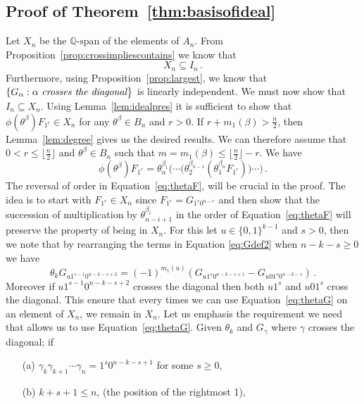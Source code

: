 \documentclass[11pt]{amsart}
\theoremstyle{definition}
\numberwithin{equation}{section}
\begin{document}
\subsection{Proof of Theorem~\ref{thm:basisofideal}}\label{ss:proofmainthm}
Let $X_n$ be the ${\mathbb Q}\text{-span}$ of the elements of $A_n$.
From Proposition~\ref{prop:crossimpliescontains} we know that
$$X_n \subseteq I_n\,.$$
Furthermore, using Proposition~\ref{prop:largest}, we know that
$\{ G_\alpha : \alpha \text{ \it crosses the diagonal}\big\}$ is linearly independent.
We must now show that $I_n\subseteq X_n$. Using Lemma~\ref{lem:idealpres} it is sufficient to show that $\phi(\theta^\beta) F_{1^r}\in X_n$ for any $ \theta^\beta \in B_n$ and
$r>0$. If $r+m_1(\beta)>\frac{n}{2}$, then Lemma~\ref{lem:degree} gives us the desired results. We can therefore assume that $0<r\le \lfloor\frac{n}{2}\rfloor$  and $\theta^\beta \in B_n$ such that $m=m_1(\beta)\le \lfloor\frac{n}{2}\rfloor-r$. We have
\begin{equation}\label{eq:thetaF}
	\phi(\theta^\beta) F_{1^r} =  \theta_n^{\beta_1} \Big(\!\!\cdots\!  \big(\theta_2^{\beta_{n-1}} (\theta_1^{\beta_n}F_{1^r})\big)\!\cdots\!\Big)\,.
\end{equation}
The reversal of order in Equation~\eqref{eq:thetaF}, will be crucial in the proof.
The idea is to start with $F_{1^r}\in X_n$ since $F_{1^r}=G_{1^r0^{n-r}}$ and then show that the succession of multiplication by $\theta_{n-i+1}^{\beta_{i}}$ in the
order of Equation~\ref{eq:thetaF} will preserve the property of being in $X_n$. For this let  $u \in \{ 0, 1\}^{k-1}$ and $s>0$, then we
note that by rearranging the terms in Equation \eqref{eq:Gdef2}
when $n-k-s \geq 0$ we have
\begin{equation}\label{eq:thetaG}
    \theta_k G_{u1^{s-1}0^{n-k-s+2}} = (-1)^{m_1(u)}( G_{u1^{s}0^{n-k-s+1}} - G_{u01^{s}0^{n-k-s}} )\,.
\end{equation}
Moreover if $u1^{s-1}0^{n-k-s+2}$ crosses the diagonal then both
$u1^{s}$ and $u01^{s}$ cross the diagonal. This ensure  that every times we can use Equation~\eqref{eq:thetaG} on an element of $X_n$, we remain in $X_n$.
Let us emphasis the requirement we need that allows us to use Equation~\eqref{eq:thetaG}. Given $\theta_k$ and $G_\gamma$ where $\gamma$ crosses the diagonal; if
\begin{enumerate}
	\item[(a)] $\gamma_{k}\gamma_{k+1}\cdots\gamma_n = 1^{s}0^{n-k-s+1}$ for some $s\ge 0$,
	\item[(b)] $k+s+1\le n$, (the position of the rightmost 1),
\end{enumerate}
\end{document}
